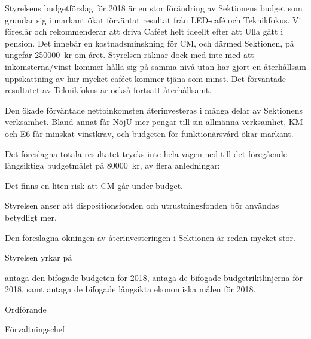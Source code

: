 \documentclass[../_main/handlingar.tex]{subfiles}
\begin{document}

Styrelsens budgetförslag för 2018 är en stor förändring av Sektionens budget som grundar sig i markant ökat förväntat resultat från LED-café och Teknikfokus. Vi föreslår och rekommenderar att driva Caféet helt ideellt efter att Ulla gått i pension. Det innebär en kostnadsminskning för CM, och därmed Sektionen, på ungefär \SI{250000}{kr} om året. Styrelsen räknar dock med inte med att inkomsterna/vinst kommer hålla sig på samma nivå utan har gjort en återhållsam uppskattning av hur mycket caféet kommer tjäna som minst. Det förväntade resultatet av Teknikfokus är också fortsatt återhållsamt.

Den ökade förväntade nettoinkomsten återinvesteras i många delar av Sektionens verksamhet. Bland annat får NöjU mer pengar till sin allmänna verksamhet, KM och E6 får minskat vinstkrav, och budgeten för funktionärsvård ökar markant.

Det föreslagna totala resultatet trycks inte hela vägen ned till det föregående långsiktiga budgetmålet på \SI{80000}{kr}, av flera anledningar:
\begin{tightdashlist}
    \item Det finns en liten risk att CM går under budget.
    \item Styrelsen anser att dispositionsfonden och utrustningsfonden bör användas betydligt mer.
    \item Den föreslagna ökningen av återinvesteringen i Sektionen är redan mycket stor.
\end{tightdashlist}

Styrelsen yrkar på

\begin{attsatser}
    \att antaga den bifogade budgeten för 2018,
    \att antaga de bifogade budgetriktlinjerna för 2018, samt
    \att antaga de bifogade långsikta ekonomiska målen för 2018.
\end{attsatser}

\begin{signatures}{2}
    \ist
    \signature{\ordf}{Ordförande}
    \signature{\fvc}{Förvaltningschef}
\end{signatures}

\newpage
\end{document}
